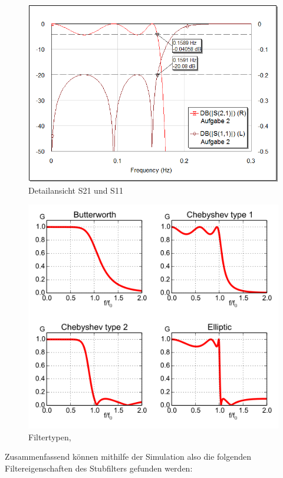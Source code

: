 \begin{figure}[h!]
\centering
 	\includegraphics[width=\imagewidth]{images/graph-LC.png}
 	\caption{Detailansicht S21 und S11}
 	\label{fig:graph-LC}
\end{figure}

\begin{figure}[h!]
\centering
 	\includegraphics[width=\imagewidth]{images/filtertypes.png}
 	\caption{Filtertypen, \cite{ref:wikipedia:chebyshev}}
 	\label{fig:filtertypes.png}
\end{figure}

Zusammenfassend   k\"onnen   mithilfe   der   Simulation  also  die  folgenden
Filtereigenschaften des Stubfilters gefunden werden:

